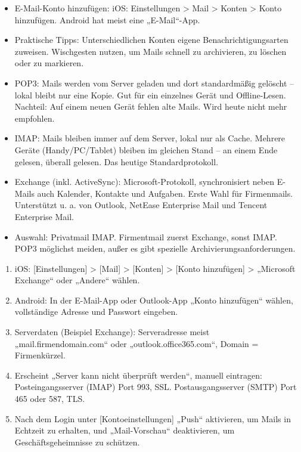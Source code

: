 \begin{itemize}
  \item E-Mail-Konto hinzufügen: iOS: Einstellungen > Mail > Konten > Konto hinzufügen. Android hat meist eine „E-Mail“-App.
  \item Praktische Tipps: Unterschiedlichen Konten eigene Benachrichtigungsarten zuweisen. Wischgesten nutzen, um Mails schnell zu archivieren, zu löschen oder zu markieren.
\end{itemize}


\begin{itemize}
  \item POP3: Mails werden vom Server geladen und dort standardmäßig gelöscht – lokal bleibt nur eine Kopie. Gut für ein einzelnes Gerät und Offline-Lesen. Nachteil: Auf einem neuen Gerät fehlen alte Mails. Wird heute nicht mehr empfohlen.
  \item IMAP: Mails bleiben immer auf dem Server, lokal nur als Cache. Mehrere Geräte (Handy/PC/Tablet) bleiben im gleichen Stand – an einem Ende gelesen, überall gelesen. Das heutige Standardprotokoll.
  \item Exchange (inkl. ActiveSync): Microsoft-Protokoll, synchronisiert neben E-Mails auch Kalender, Kontakte und Aufgaben. Erste Wahl für Firmenmails. Unterstützt u. a. von Outlook, NetEase Enterprise Mail und Tencent Enterprise Mail.
  \item Auswahl: Privatmail IMAP. Firmentmail zuerst Exchange, sonst IMAP. POP3 möglichst meiden, außer es gibt spezielle Archivierungsanforderungen.
\end{itemize}


\begin{enumerate}
  \item iOS: [Einstellungen] > [Mail] > [Konten] > [Konto hinzufügen] > „Microsoft Exchange“ oder „Andere“ wählen.
  \item Android: In der E-Mail-App oder Outlook-App „Konto hinzufügen“ wählen, vollständige Adresse und Passwort eingeben.
  \item Serverdaten (Beispiel Exchange): Serveradresse meist „mail.firmendomain.com“ oder „outlook.office365.com“, Domain = Firmenkürzel.
  \item Erscheint „Server kann nicht überprüft werden“, manuell eintragen: Posteingangsserver (IMAP) Port 993, SSL. Postausgangsserver (SMTP) Port 465 oder 587, TLS.
  \item Nach dem Login unter [Kontoeinstellungen] „Push“ aktivieren, um Mails in Echtzeit zu erhalten, und „Mail-Vorschau“ deaktivieren, um Geschäftsgeheimnisse zu schützen.
\end{enumerate}


